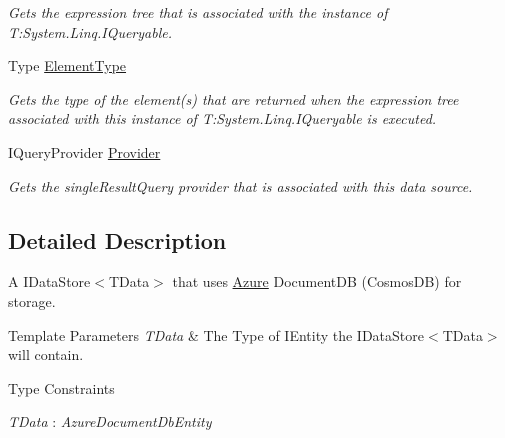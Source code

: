 \begin{DoxyCompactItemize}
\begin{DoxyCompactList}\small\item\em Gets the expression tree that is associated with the instance of T\+:\+System.\+Linq.\+I\+Queryable. \end{DoxyCompactList}\item 
Type \hyperlink{classCqrs_1_1Azure_1_1DocumentDb_1_1DataStores_1_1AzureDocumentDbDataStore_a6c007c12b342eeeb936ba748e5391bc3_a6c007c12b342eeeb936ba748e5391bc3}{Element\+Type}
\begin{DoxyCompactList}\small\item\em Gets the type of the element(s) that are returned when the expression tree associated with this instance of T\+:\+System.\+Linq.\+I\+Queryable is executed. \end{DoxyCompactList}\item 
I\+Query\+Provider \hyperlink{classCqrs_1_1Azure_1_1DocumentDb_1_1DataStores_1_1AzureDocumentDbDataStore_ac7beb3868691d1cba378fa58e3f0e999_ac7beb3868691d1cba378fa58e3f0e999}{Provider}
\begin{DoxyCompactList}\small\item\em Gets the single\+Result\+Query provider that is associated with this data source. \end{DoxyCompactList}\end{DoxyCompactItemize}


\subsection{Detailed Description}
A I\+Data\+Store$<$\+T\+Data$>$ that uses \hyperlink{namespaceCqrs_1_1Azure}{Azure} Document\+DB (Cosmos\+DB) for storage. 


\begin{DoxyTemplParams}{Template Parameters}
{\em T\+Data} & The Type of I\+Entity the I\+Data\+Store$<$\+T\+Data$>$ will contain.\\
\hline
\end{DoxyTemplParams}
\begin{Desc}
\item[Type Constraints]\begin{description}
\item[{\em T\+Data} : {\em Azure\+Document\+Db\+Entity}]\end{description}
\end{Desc}


